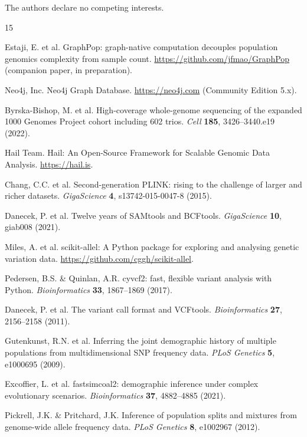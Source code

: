 \documentclass[pdflatex,sn-nature]{sn-jnl}
\begin{document}

The authors declare no competing interests.

\begin{thebibliography}{15}

Estaji, E. et al. GraphPop: graph-native computation decouples population genomics complexity from sample count. \url{https://github.com/jfmao/GraphPop} (companion paper, in preparation).

Neo4j, Inc. Neo4j Graph Database. \url{https://neo4j.com} (Community Edition 5.x).

Byrska-Bishop, M. et al. High-coverage whole-genome sequencing of the expanded 1000 Genomes Project cohort including 602 trios. \textit{Cell} \textbf{185}, 3426--3440.e19 (2022).

Hail Team. Hail: An Open-Source Framework for Scalable Genomic Data Analysis. \url{https://hail.is}.

Chang, C.C. et al. Second-generation PLINK: rising to the challenge of larger and richer datasets. \textit{GigaScience} \textbf{4}, s13742-015-0047-8 (2015).

Danecek, P. et al. Twelve years of SAMtools and BCFtools. \textit{GigaScience} \textbf{10}, giab008 (2021).

Miles, A. et al. scikit-allel: A Python package for exploring and analysing genetic variation data. \url{https://github.com/cggh/scikit-allel}.

Pedersen, B.S. \& Quinlan, A.R. cyvcf2: fast, flexible variant analysis with Python. \textit{Bioinformatics} \textbf{33}, 1867--1869 (2017).

Danecek, P. et al. The variant call format and VCFtools. \textit{Bioinformatics} \textbf{27}, 2156--2158 (2011).

Gutenkunst, R.N. et al. Inferring the joint demographic history of multiple populations from multidimensional SNP frequency data. \textit{PLoS Genetics} \textbf{5}, e1000695 (2009).

Excoffier, L. et al. fastsimcoal2: demographic inference under complex evolutionary scenarios. \textit{Bioinformatics} \textbf{37}, 4882--4885 (2021).

Pickrell, J.K. \& Pritchard, J.K. Inference of population splits and mixtures from genome-wide allele frequency data. \textit{PLoS Genetics} \textbf{8}, e1002967 (2012).


\end{thebibliography}
\end{document}
